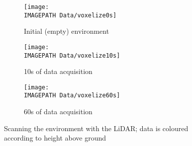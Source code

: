 \begin{figure}[!ht]
	\centering
	\begin{subfigure}[b]{0.50\textwidth}
		\texttt{[image: \\IMAGEPATH Data/voxelize0s]}
		\caption{Initial (empty) environment}
		\label{fig:scaninit}
	\end{subfigure}
	
	\begin{subfigure}[b]{0.50\textwidth}
		\texttt{[image: \\IMAGEPATH Data/voxelize10s]}
		\caption{10s of data acquisition}
		\label{fig:scanten}
	\end{subfigure}
	
	\begin{subfigure}[b]{0.50\textwidth}
		\texttt{[image: \\IMAGEPATH Data/voxelize60s]}
		\caption{60s of data acquisition}
		\label{fig:scanminute}
	\end{subfigure}
	\caption{Scanning the environment with the LiDAR; data is coloured according to height above ground}
	\label{fig:scan}
\end{figure}